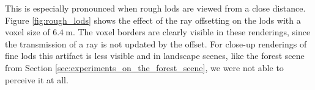 This is especially pronounced when rough \acsp{lod} are viewed from a close distance.
Figure \ref{fig:rough_lods} shows the effect of the ray offsetting on the \acsp{lod} with a voxel size of $\SI{6.4}{\m}$.
The voxel borders are clearly visible in these renderings, since the transmission of a ray is not updated by the offset.
For close-up renderings of fine \acsp{lod} this artifact is less visible and in landscape scenes, like the forest scene from Section \ref{sec:experiments_on_the_forest_scene}, we were not able to perceive it at all.







